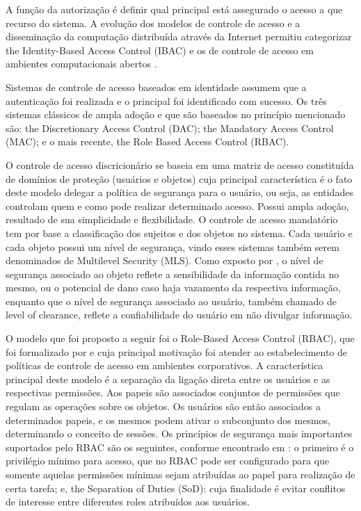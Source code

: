 \documentclass{doublecol-new}
\begin{document}
A função da autorização é definir qual principal está assegurado o acesso a que recurso do sistema. A evolução dos modelos de controle de acesso e a disseminação da computação distribuída através da Internet permitiu categorizar the Identity-Based Access Control (IBAC) e os de controle de acesso em ambientes computacionais abertos \cite{gollmann2011compsecurity}.

Sistemas de controle de acesso baseados em identidade assumem que a autenticação foi realizada e o principal foi identificado com sucesso. Os três sistemas clássicos de ampla adoção e que são baseados no princípio mencionado são: the Discretionary Access Control (DAC); the Mandatory Access Control (MAC); e o mais recente, the Role Based Access Control (RBAC).

O controle de acesso discricionário \cite{lampson1974protection} se baseia em uma matriz de acesso constituída de domínios de proteção (usuários e objetos) cuja principal característica é o fato deste modelo delegar a política de segurança para o usuário, ou seja, as entidades controlam quem e como pode realizar determinado acesso. Possui ampla adoção, resultado de sua simplicidade e flexibilidade. O controle de acesso mandatório tem por base a classificação dos sujeitos e dos objetos no sistema. Cada usuário e cada objeto possui um nível de segurança, vindo esses sistemas também serem denominados de Multilevel Security (MLS). Como exposto por \cite{sandhu1994access}, o nível de segurança associado ao objeto reflete a sensibilidade da informação contida no mesmo, ou o potencial de dano caso haja vazamento da respectiva informação, enquanto que o nível de segurança associado ao usuário, também chamado de level of clearance, reflete a confiabilidade do usuário em não divulgar informação. 

O modelo que foi proposto a seguir foi o Role-Based Access Control (RBAC), que foi formalizado por \cite{ferraiolo1992role} e cuja principal motivação foi atender ao estabelecimento de políticas de controle de acesso em ambientes corporativos. A característica principal deste modelo é a separação da ligação direta entre os usuários e as respectivas permissões. Aos papeis são associados conjuntos de permissões que regulam as operações sobre os objetos. Os usuários são então associados a determinados papeis, e os mesmos podem ativar o subconjunto dos mesmos, determinando o conceito de sessões. Os princípios de segurança mais importantes suportados pelo RBAC são os seguintes, conforme encontrado em \cite{sandhu1996role}: o primeiro é o privilégio mínimo para acesso, que no RBAC pode ser configurado para que somente aquelas permissões mínimas sejam atribuídas ao papel para realização de certa tarefa; e, the Separation of Duties (SoD): cuja finalidade é evitar conflitos de interesse entre diferentes roles atribuídos aos usuários.
\end{document}
